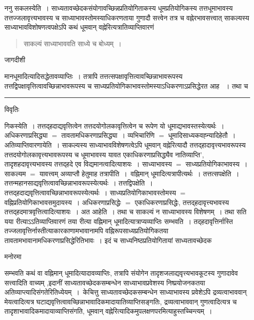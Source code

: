 \documentclass[10pt, openany]{book}
\begin{document}
{ननु सकलस्येति~। साध्यतावच्छेदकसंयोगावच्छिन्नप्रतियोगिताकस्य धूमप्रतियोगिकस्य तत्तधूमाभावस्य तत्तज्जलावृत्त्यभावस्य च साध्याभावस्तोमस्याधिकरणताया
गुणादौ सत्त्वेन तत्र च वह्नेरभावसत्त्वात् साकल्यस्य साध्याभावविशोषणत्वपक्षेऽपि कथं धूमवान् वह्नेरित्यत्रातिव्याप्तिवारणं
\newpage
\begin{quote}
\vpc
साकल्यं साध्याभाववति साध्ये च बोध्यम्~।~    
\end{quote}
\begin{center} जागदीशी \end{center}
{\la मानधूमादित्यादिसद्धेतावव्याप्तिः~। तत्रापि तत्तत्सपक्षावृत्तित्वावच्छिन्नाभावरूपस्य तत्तद्विपक्षावृत्तित्वावच्छिन्नाभावरूपस्य च साध्यप्रतियोगिकाभावस्तोमस्याऽधिकरणाऽप्रसिद्धेरत आह  ~। तथा च}\\
\hrule
\begin{center}     विवृतिः \end{center}
गिकस्येति~। तत्तद्हदाद्यवृत्तित्वेन तत्तदयोगोलकावृत्तित्वेन च रूपेण यो धूमाद्यभावस्तस्येत्यर्थः~। अधिकरणाप्रसिद्ध्या $=$ तावतामधिकरणाप्रसिद्ध्या~। व्यभिचारिणि $=$ धूमादिसाध्यकवह्न्यादिहेतौ~। अतिव्याप्तिवारणायेति~। साकल्यस्य साध्याभावविशेषणत्वेऽपि धूमवान् वह्नेरित्यादौ तत्तद्हादावृत्त्यभावरूपस्य तत्तदयोगोलकावृत्त्यभावरूपस्य च धूमाभावस्य यावत एकाधिकरणाप्रसिद्ध्यैव नातिव्याप्ति', तादृशहदावृत्त्यभावस्य तत्तद्हदे एव विद्यमानत्वादित्याशयः~। साध्याभावस्य $=$ साध्यप्रतियोगिकाभावस्य~। साकल्यम $=$ यावत्त्वम् अव्याप्तौ  हेतुमाह {\la तत्रापीति~।}~वह्निमान् धूमादित्यत्रापीत्यर्थः~। तत्तत्सपक्षेति~। तत्तन्महानसाद्यवृत्तित्वावच्छिन्नाभावरूपस्येत्यर्थः~। तत्तद्विपक्षेति~। तत्तद्हदाद्यवृत्तित्वावच्छिन्नाभावरूपस्येत्यर्थः~। साध्यप्रतियोगिकाभावस्तोमस्य $=$ वह्निप्रतियोगिकाभावसमुदायस्य~। अधिकरणाप्रसिद्धेः $=$ एकाधिकरणाप्रसिद्धेः, तत्तद्हदावृत्त्यभावस्य तत्तद्हदमात्रवृत्तित्वादित्याशयः~। अत आहेति~। तथा च साकल्यं न साध्याभावस्य विशेषणम्~। तथा सति यया रीत्याऽऽतिव्याप्तिवारणं तया रीत्या वह्निमान् धूमादित्यात्राप्यव्याप्तिः सम्भवति~। तद्हदावृत्तिर्नास्ति  तज्जलावृत्तिर्नास्तीत्याकारकाणामभावानामपि वह्निरूपसाध्यप्रतियोगिकतया तावतामभावानामधिकरणाप्रसिद्धेरितिभावः~। इदं च साध्यनिष्ठप्रतियोगितायां साध्यतावच्छेदक
\begin{center}   मनोरमा  \end{center}
सम्भवति कथं वा वह्निमान् धूमादित्यादावव्याप्तिः, तत्रापि संयोगेन तादृशजलाद्यवृत्त्यभावकूटस्य गुणादावेव सत्त्वादिति वाच्यम् ,इदानीं साध्यतावच्छेदकसम्बन्धेन
साध्याभावप्रवेशस्य निष्प्रयोजनकतया अतिव्याप्त्यादिसंगतेरितिध्येयम्~।~{\la केचित्तु} साध्यतावच्छेदकसम्बन्धेन साध्याभावस्य प्रवेशेऽपि द्रव्यत्वाभाववान् मेयत्वादित्यत्र
घटाद्यवृत्तित्वावच्छिन्नाभावादिकमादायातिव्याप्तिसङ्गतिः, द्रव्यत्वाभाववान् गुणत्वादित्यत्र च तादृशाभावादिकमादायाव्याप्तिसंगति, धूमवान् वह्नेरित्यादिकमुपलक्षणपरमित्याहुस्तच्चिन्त्यम्~।\\

}
\end{document}
